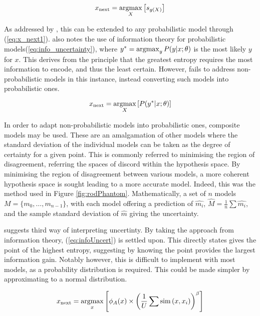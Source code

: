 \begin{equation}
    \label{eq:x_next1}
    x_\mathrm{next}=\operatorname*{argmax}_X{\left[s_{g(X)}\right]}
\end{equation}

As addressed by \textcite{Set09}, this can be extended to any probabilistic model through (\ref{eq:x_next1}). \textcite{Set09} also notes the use of information theory for probabilistic models(\ref{eq:info_uncertainty}), where $y^{*}=\operatorname*{argmax}_y{}P(y|x;\theta{})$ is the most likely $y$ for $x$. This derives from the principle that the greatest entropy requires the most information to encode, and thus the least certain. However, \textcite{Set09} fails to address non-probabilistic models in this instance, instead converting such models into probabilistic ones.


\begin{equation}
    \label{eq:info_uncertainty}
    {x_\mathrm{next}=\operatorname*{argmax}_X{\left[P(y^{*}|x;\theta{})\right]}}
\end{equation}

In order to adapt non-probabilistic models into probabilistic ones, composite models may be used. These are an amalgamation of other models where the standard deviation of the individual models can be taken as the degree of certainty for a given point. This is commonly referred to minimising the region of disagreement, referring the spaces of discord within the hypothesis space. By minimising the region of disagreement between various models, a more coherent hypothesis space is sought leading to a more accurate model. Indeed, this was the method used in Figure \ref{fig:rodPhantom}. Mathematically, a set of $n$ models ${M = \{m_0,\ldots{}, m_{n-1}\}}$, with each model offering a prediction of $\hat{m_i}$, ${\hat{M}=\frac{1}{n}\sum{\hat{m_i}}}$, and the sample standard deviation of $\hat{m}$ giving the uncertainty.


\textcite{Set09} suggests  third way of interpreting uncertinty. By taking the approach from information theory, (\ref{eq:infoUncert}) is settled upon. This directly states gives the point of the highest entropy, suggesting by knowing the point provides the largest information gain. Notably however, this is difficult to implement with most models, as a probability distribution is required. This could be made simpler by approximating to a normal distribution.

\begin{equation}
    \label{eq:infoUncert}
    x_\mathrm{next}=\operatorname*{argmax}_x{\left[\phi_A(x)\times{\left(\frac{1}{U}\sum{\operatorname*{sim}{(x, x_i)}}\right)}^\beta\right]}
\end{equation}


